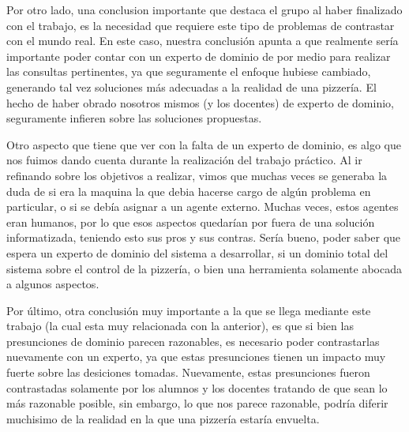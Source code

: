 \documentclass[a4paper,10pt]{article}
\begin{document}
\medskip

Por otro lado, una conclusion importante que destaca el grupo al haber finalizado con el trabajo, es la necesidad que requiere este tipo de
problemas de contrastar con el mundo real. En este caso, nuestra conclusi\'on apunta a que realmente ser\'ia importante poder contar con un 
experto de dominio de por medio para realizar las consultas pertinentes, ya que seguramente el enfoque hubiese cambiado, generando tal vez soluciones
m\'as adecuadas a la realidad de una pizzer\'ia. El hecho de haber obrado nosotros mismos (y los docentes) de experto de dominio, seguramente infieren
sobre las soluciones propuestas.

Otro aspecto que tiene que ver con la falta de un experto de dominio, es algo que nos fuimos dando cuenta durante la realizaci\'on del trabajo pr\'actico.
Al ir refinando sobre los objetivos a realizar, vimos que muchas veces se generaba la duda de si era la maquina la que debia hacerse cargo de
alg\'un problema en particular, o si se deb\'ia asignar a un agente externo. Muchas veces, estos agentes eran humanos, por lo que esos aspectos
quedar\'ian por fuera de una soluci\'on informatizada, teniendo esto sus pros y sus contras. Ser\'ia bueno, poder saber que espera un experto de 
dominio del sistema a desarrollar, si un dominio total del sistema sobre el control de la pizzer\'ia, o bien una herramienta solamente abocada a algunos
aspectos.

\medskip

Por \'ultimo, otra conclusi\'on muy importante a la que se llega mediante este trabajo (la cual esta muy relacionada con la anterior), es que 
si bien las presunciones de dominio parecen razonables, es necesario poder contrastarlas nuevamente con un experto, ya que estas presunciones
tienen un impacto muy fuerte sobre las desiciones tomadas. Nuevamente, estas presunciones fueron contrastadas solamente por los alumnos y los docentes
tratando de que sean lo m\'as razonable posible, sin embargo, lo que nos parece razonable, podr\'ia diferir muchisimo de la realidad en la que 
una pizzer\'ia estar\'ia envuelta.
\end{document}
